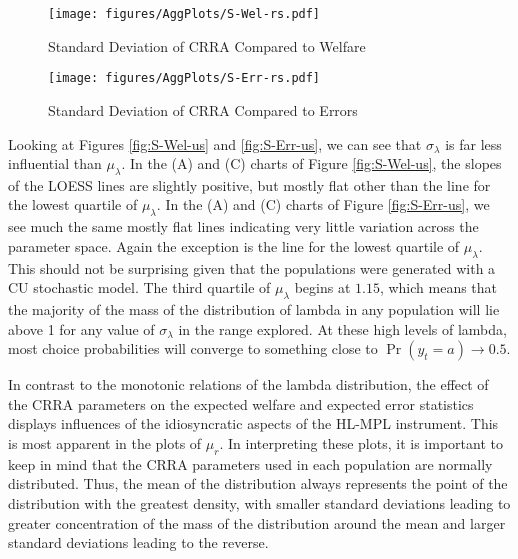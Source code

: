 \documentclass[../main.tex]{subfiles}
\begin{document}
\begin{figure}[h!]
	\center
	\caption{Standard Deviation of CRRA Compared to Welfare}
	\texttt{[image: figures/AggPlots/S-Wel-rs.pdf]}
	\label{fig:S-Wel-rs}
\end{figure}

\begin{figure}[h!]
	\center
	\caption{Standard Deviation of CRRA Compared to Errors}
	\texttt{[image: figures/AggPlots/S-Err-rs.pdf]}
	\label{fig:S-Err-rs}
\end{figure}

Looking at Figures \ref{fig:S-Wel-us} and \ref{fig:S-Err-us}, we can see that $\sigma_\lambda$ is far less influential than $\mu_\lambda$.
In the (A) and (C) charts of Figure \ref{fig:S-Wel-us}, the slopes of the LOESS lines are slightly positive, but mostly flat other than the line for the lowest quartile of $\mu_\lambda$.
In the (A) and (C) charts of Figure \ref{fig:S-Err-us}, we see much the same mostly flat lines indicating very little variation across the parameter space.
Again the exception is the line for the lowest quartile of $\mu_\lambda$.
This should not be surprising given that the populations were generated with a CU stochastic model.
The third quartile of $\mu_\lambda$ begins at $1.15$, which means that the majority of the mass of the distribution of lambda in any population will lie above 1 for any value of $\sigma_\lambda$ in the range explored.
At these high levels of lambda, most choice probabilities will converge to something close to $\Pr( y_t = a) \to 0.5$.


In contrast to the monotonic relations of the lambda distribution, the effect of the CRRA parameters on the expected welfare and expected error statistics displays influences of the idiosyncratic aspects of the HL-MPL instrument.
This is most apparent in the plots of $\mu_r$.
In interpreting these plots, it is important to keep in mind that the CRRA parameters used in each population are normally distributed.
Thus, the mean of the distribution always represents the point of the distribution with the greatest density, with smaller standard deviations leading to greater concentration of the mass of the distribution around the mean and larger standard deviations leading to the reverse.
\end{document}
